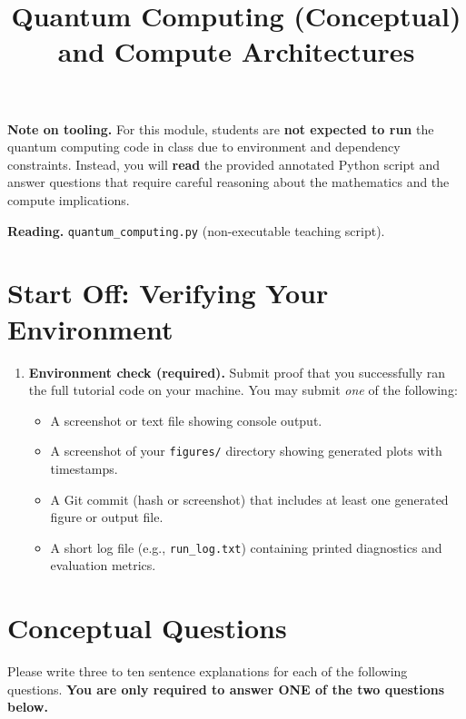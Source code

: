 \documentclass[11pt]{article}
\title{ Quantum Computing (Conceptual) and Compute Architectures}
\author{ }
\date{ }
\begin{document}
\maketitle

\noindent \textbf{Note on tooling.} For this module, students are \textbf{not expected to run} the quantum computing code in class due to environment and dependency constraints. Instead, you will \textbf{read} the provided annotated Python script and answer questions that require careful reasoning about the mathematics and the compute implications.

\bigskip
\noindent \textbf{Reading.} \texttt{quantum\_computing.py} (non-executable teaching script).

\section*{Start Off: Verifying Your Environment}

\begin{enumerate}
\item \textbf{Environment check (required).}  
Submit proof that you successfully ran the full tutorial code on your machine. You may submit \emph{one} of the following:
\begin{itemize}
  \item A screenshot or text file showing console output.
  \item A screenshot of your \texttt{figures/} directory showing generated plots with timestamps.
  \item A Git commit (hash or screenshot) that includes at least one generated figure or output file.
  \item A short log file (e.g., \texttt{run\_log.txt}) containing printed diagnostics and evaluation metrics.
\end{itemize}
\end{enumerate}

\section*{Conceptual Questions}
Please write three to ten sentence explanations for each of the following questions. \textbf{You are only required to answer ONE of the two questions below.} \bigskip
 
\end{document}
